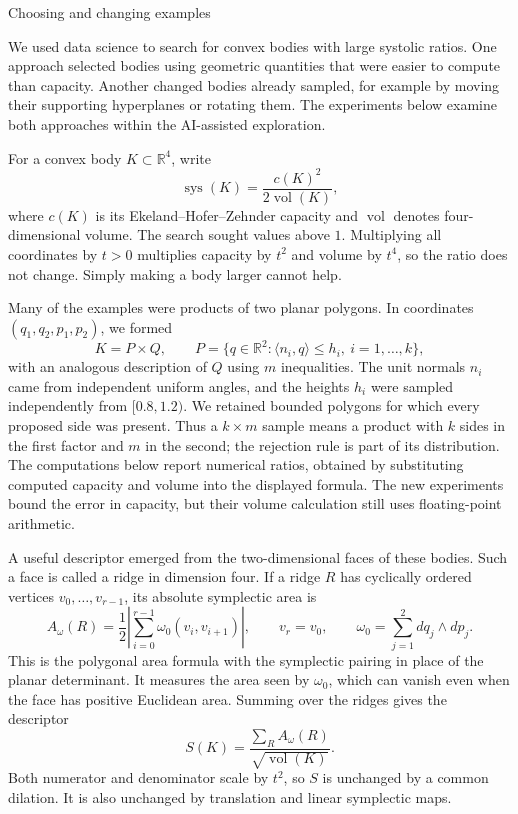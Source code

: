 \documentclass[11pt,a4paper]{article}
\newcommand{\sys}{\operatorname{sys}}
\newcommand{\vol}{\operatorname{vol}}
\begin{document}
\begin{center}
{\Large Choosing and changing examples}
\end{center}
\noindent
We used data science to search for convex bodies with large systolic ratios.
One approach selected bodies using geometric quantities that were easier to
compute than capacity. Another changed bodies already sampled, for example by
moving their supporting hyperplanes or rotating them. The experiments below
examine both approaches within the AI-assisted exploration.

For a convex body $K\subset\mathbb R^4$, write
\[
  \sys(K)=\frac{c(K)^2}{2\vol(K)},
\]
where $c(K)$ is its Ekeland--Hofer--Zehnder capacity and $\vol$ denotes
four-dimensional volume. The search sought values above $1$. Multiplying all
coordinates by $t>0$ multiplies capacity by $t^2$ and volume by $t^4$, so the
ratio does not change. Simply making a body larger cannot help.

Many of the examples were products of two planar polygons. In coordinates
$(q_1,q_2,p_1,p_2)$, we formed
\[
 K=P\times Q,\qquad
 P=\{q\in\mathbb R^2:\langle n_i,q\rangle\le h_i,\ i=1,\ldots,k\},
\]
with an analogous description of $Q$ using $m$ inequalities. The unit normals
$n_i$ came from independent uniform angles, and the heights $h_i$ were sampled
independently from $[0.8,1.2)$. We retained bounded polygons for which every
proposed side was present. Thus a $k\times m$ sample means a product with $k$
sides in the first factor and $m$ in the second; the rejection rule is part of
its distribution. The computations below report numerical ratios, obtained by
substituting computed capacity and volume into the displayed formula. The new
experiments bound the error in capacity, but their volume calculation still uses
floating-point arithmetic.

A useful descriptor emerged from the two-dimensional faces of these bodies.
Such a face is called a ridge in dimension four. If a ridge $R$ has cyclically
ordered vertices $v_0,\ldots,v_{r-1}$, its absolute symplectic area is
\[
 A_\omega(R)=\frac12\left|\sum_{i=0}^{r-1}\omega_0(v_i,v_{i+1})\right|,
 \qquad v_r=v_0,
 \qquad \omega_0=\sum_{j=1}^2dq_j\wedge dp_j.
\]
This is the polygonal area formula with the symplectic pairing in place of the
planar determinant. It measures the area seen by $\omega_0$, which can vanish
even when the face has positive Euclidean area. Summing over the ridges gives
the descriptor
\[
 S(K)=\frac{\sum_R A_\omega(R)}{\sqrt{\vol(K)}}.
\]
Both numerator and denominator scale by $t^2$, so $S$ is unchanged by a common
dilation. It is also unchanged by translation and linear symplectic maps.
\end{document}
